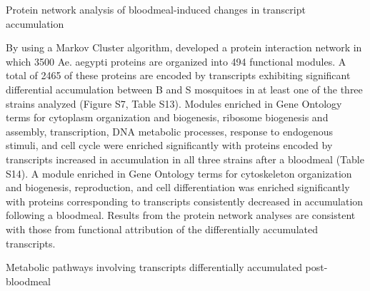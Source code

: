 Protein network analysis of bloodmeal-induced changes in transcript accumulation

By using a Markov Cluster algorithm, \cite{Guo2010} developed a protein interaction network in which 3500 Ae. aegypti proteins are organized into 494 functional modules. A total of 2465 of these proteins are encoded by transcripts exhibiting significant differential accumulation between B and S mosquitoes in at least one of the three strains analyzed (Figure S7, Table S13). Modules enriched in Gene Ontology terms for cytoplasm organization and biogenesis, ribosome biogenesis and assembly, transcription, DNA metabolic processes, response to endogenous stimuli, and cell cycle were enriched significantly with proteins encoded by transcripts increased in accumulation in all three strains after a bloodmeal (Table S14). A module enriched in Gene Ontology terms for cytoskeleton organization and biogenesis, reproduction, and cell differentiation was enriched significantly with proteins corresponding to transcripts consistently decreased in accumulation following a bloodmeal. Results from the protein network analyses are consistent with those from functional attribution of the differentially accumulated transcripts.

Metabolic pathways involving transcripts differentially accumulated post-bloodmeal


